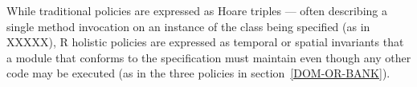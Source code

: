 
  
{}
While traditional policies are
expressed as Hoare triples --- often describing a single method
invocation on an instance of the class being specified (as in
XXXXX), R%
holistic policies are expressed as 
temporal or spatial invariants that a module that
conforms to the specification must maintain even though any other code
may be executed (as in the three policies in section~\ref{DOM-OR-BANK}).



